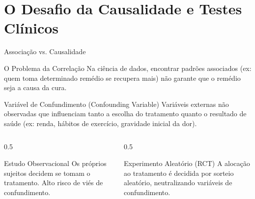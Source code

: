 \section{O Desafio da Causalidade e Testes Clínicos}

\begin{frame}{Associação vs. Causalidade}
    \begin{block}{O Problema da Correlação}
        Na ciência de dados, encontrar padrões associados (ex: quem toma determinado remédio se recupera mais) não garante que o remédio seja a causa da cura.
    \end{block}
    \begin{block}{Variável de Confundimento (Confounding Variable)}
        Variáveis externas não observadas que influenciam tanto a escolha do tratamento quanto o resultado de saúde (ex: renda, hábitos de exercício, gravidade inicial da dor).
    \end{block}
    \begin{columns}
        \begin{column}{0.5\textwidth}
            \begin{alertblock}{Estudo Observacional}
                Os próprios sujeitos decidem se tomam o tratamento. Alto risco de viés de confundimento.
            \end{alertblock}
        \end{column}
        \begin{column}{0.5\textwidth}
            \begin{alertblock}{Experimento Aleatório (RCT)}
                A alocação ao tratamento é decidida por sorteio aleatório, neutralizando variáveis de confundimento.
            \end{alertblock}
        \end{column}
    \end{columns}
\end{frame}

